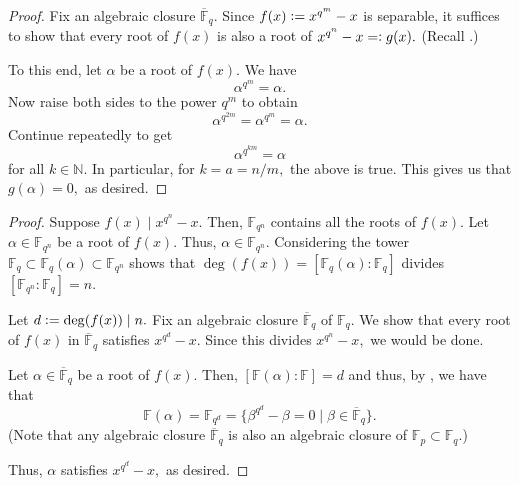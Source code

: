 \xdxxnxdiv*\label{lem:xdxxnxdiv2}
\begin{flushright}\hyperref[lem:xdxxnxdiv]{\upsym}\end{flushright}
\begin{proof}
    Fix an algebraic closure $\overline{\mathbb{F}}_q.$ Since $f(x) \vcentcolon= x^{q^m} - x$ is separable, it suffices to show that every root of $f(x)$ is also a root of $x^{q^n} - x =\vcentcolon g(x).$ (Recall .)

    To this end, let $\alpha$ be a root of $f(x).$ We have 
    \begin{equation*} 
        \alpha^{q^m} = \alpha.
    \end{equation*}
    Now raise both sides to the power $q^m$ to obtain 
    \begin{equation*} 
        \alpha^{q^{2m}} = \alpha^{q^m} = \alpha.
    \end{equation*}
    Continue repeatedly to get 
    \begin{equation*} 
        \alpha^{q^{km}} = \alpha
    \end{equation*}
    for all $k \in \mathbb{N}.$ In particular, for $k = a = n/m,$ the above is true. This gives us that $g(\alpha) = 0,$ as desired.
\end{proof}

\irreddivsplitpoly*\label{lem:irreddivsplitpoly2}
\begin{flushright}\hyperref[lem:irreddivsplitpoly]{\upsym}\end{flushright}
\begin{proof}
    \forward Suppose $f(x) \mid x^{q^n} - x.$ Then, $\mathbb{F}_{q^n}$ contains all the roots of $f(x).$ Let $\alpha \in \mathbb{F}_{q^n}$ be a root of $f(x).$ Thus, $\alpha \in \mathbb{F}_{q^n}.$ Considering the tower $\mathbb{F}_q \subset \mathbb{F}_q(\alpha) \subset \mathbb{F}_{q^n}$ shows that $\deg(f(x)) = [\mathbb{F}_q(\alpha) : \mathbb{F}_q]$ divides $[\mathbb{F}_{q^n} : \mathbb{F}_q] = n.$

    \backward Let $d \vcentcolon= \deg(f(x)) \mid n.$ Fix an algebraic closure $\overline{\mathbb{F}}_q$ of $\mathbb{F}_q.$ We show that every root of $f(x)$ in $\overline{\mathbb{F}}_q$ satisfies $x^{q^d} - x.$ Since this divides $x^{q^n} - x,$ we would be done.

    Let $\alpha \in \overline{\mathbb{F}}_q$ be a root of $f(x).$ Then, $[\mathbb{F}(\alpha) : \mathbb{F}] = d$ and thus, by , we have that
    \begin{equation*} 
        \mathbb{F}(\alpha) = \mathbb{F}_{q^d} = \{\beta^{q^d} - \beta = 0 \mid \beta \in \overline{\mathbb{F}}_q\}.
    \end{equation*}
    (Note that any algebraic closure $\overline{\mathbb{F}}_q$ is also an algebraic closure of $\mathbb{F}_p \subset \mathbb{F}_q.$)

    Thus, $\alpha$ satisfies $x^{q^d} - x,$ as desired.
\end{proof}

